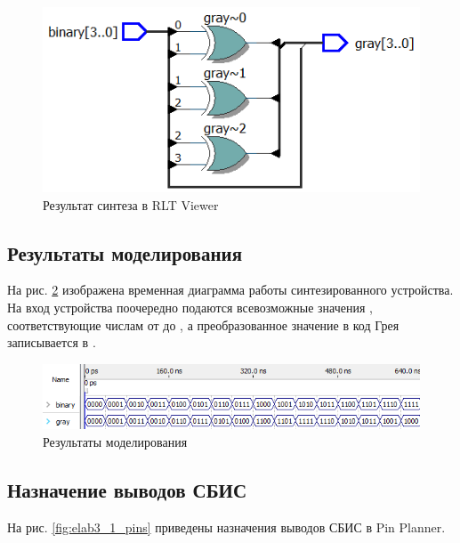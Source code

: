 \begin{figure}[H]
\begin{center}
	\includegraphics[scale=0.9]{elab3_1_rtl}
	\caption{Результат синтеза в RLT Viewer}
	\label{fig:elab3_1_rtl}
\end{center}
\end{figure}

\subsection{Результаты моделирования}
\label{sec:elab3_1_modeling}

На рис. \ref{fig:elab3_1_modeling} изображена временная диаграмма работы синтезированного устройства. На вход устройства поочередно подаются всевозможные значения , соответствующие числам от  до , а преобразованное значение в код Грея записывается в .

\begin{figure}[H]
\begin{center}
	\includegraphics[width=\textwidth]{elab3_1_modeling}
	\caption{Результаты моделирования}
	\label{fig:elab3_1_modeling}
\end{center}
\end{figure}

\subsection{Назначение выводов СБИС}

На рис. \ref{fig:elab3_1_pins} приведены назначения выводов СБИС в Pin Planner.


